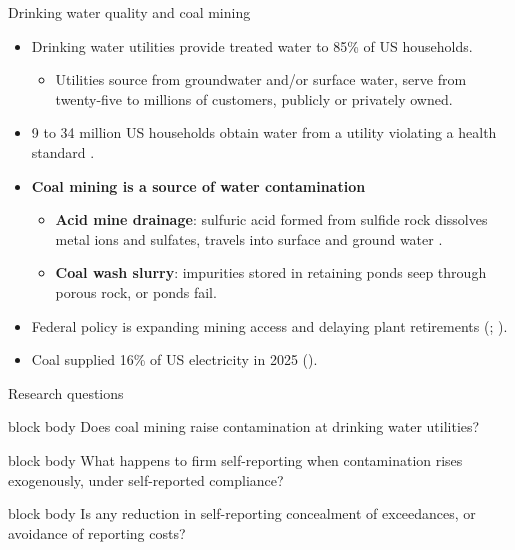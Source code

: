 \documentclass{beamer}
\begin{document}
\begin{frame}{Drinking water quality and coal mining}
\begin{itemize}
    \item Drinking water utilities provide treated water to 85\% of US households.
    \begin{itemize}
        \item Utilities source from groundwater and/or surface water, serve from twenty-five to millions of customers, publicly or privately owned.
    \end{itemize}
    \item 9 to 34 million US households obtain water from a utility violating a health standard \parencite{allaire2018national}.
    \item \textbf{Coal mining is a source of water contamination} 
    \begin{itemize}
        \item \textbf{Acid mine drainage}: sulfuric acid formed from sulfide rock dissolves metal ions and sulfates, travels into surface and ground water \parencite{skousen2019acid}.
        \item \textbf{Coal wash slurry}: impurities stored in retaining ponds seep through porous rock, or ponds fail.
    \end{itemize}
    \item Federal policy is expanding mining access and delaying plant retirements (\cite{Trump2025EO14260}; \cite{Daly2025CoalMining}).
    \item Coal supplied 16\% of US electricity in 2025 (\cite{IEA2025GER}).
    \end{itemize}
\end{frame}

\begin{frame}{Research questions}
\begin{center}
\begin{beamercolorbox}[sep=10pt,center,rounded=true,shadow=true]{block body}
\large Does coal mining raise contamination at drinking water utilities?
\end{beamercolorbox}
\end{center}

\begin{center}
\begin{beamercolorbox}[sep=10pt,center,rounded=true,shadow=true]{block body}
\large What happens to firm self-reporting when contamination rises exogenously, under self-reported compliance?
\end{beamercolorbox}
\end{center}

\begin{center}
\begin{beamercolorbox}[sep=10pt,center,rounded=true,shadow=true]{block body}
\large Is any reduction in self-reporting concealment of exceedances, or avoidance of reporting costs?
\end{beamercolorbox}
\end{center}
\end{frame}
\end{document}
